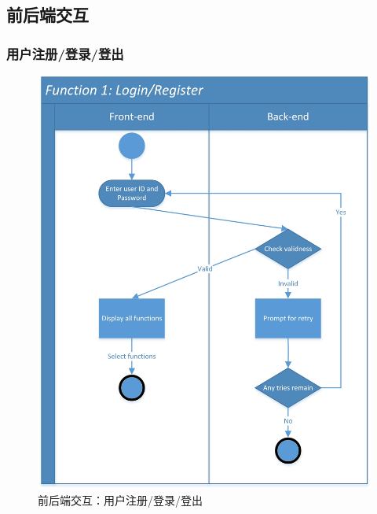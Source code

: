 \documentclass[twoside,11pt]{article}
\begin{document}
\subsection{前后端交互}

\subsubsection{用户注册/登录/登出}

\begin{figure}[H]
    \centering
    \includegraphics[width=0.9\columnwidth]{SwimLaneDiagram/Usecase_1.jpg}
    \caption{前后端交互：用户注册/登录/登出}
    \label{fig:userlogin}
\end{figure}
\newpage
\end{document}
